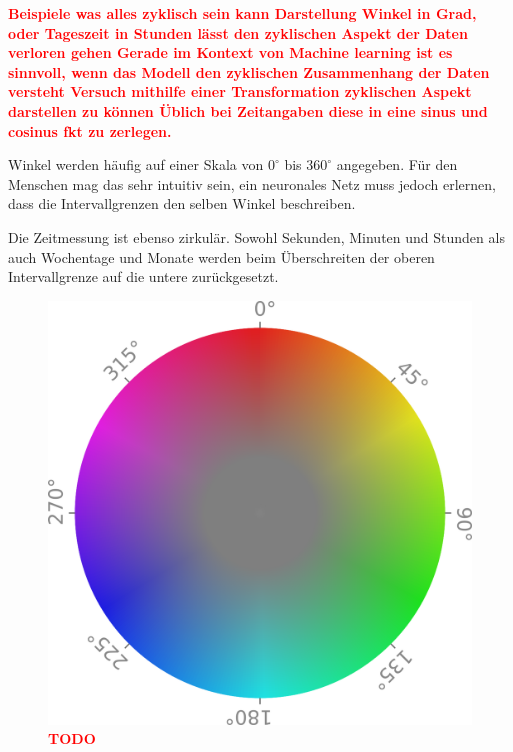 \documentclass[
12pt, %
toc=listofnumbered, %
toc=chapterentrydotfill, %
numbers=noenddot, %
captions=tableheading, %
bibliography=numbered
]{scrreprt}
\newcommand{\highlight}[1]{\textbf{\textcolor{red}{#1}}}
\begin{document}
\highlight{
	Beispiele was alles zyklisch sein kann
	Darstellung Winkel in Grad, oder Tageszeit in Stunden lässt den zyklischen Aspekt der Daten verloren gehen 
	Gerade im Kontext von Machine learning ist es sinnvoll, wenn das Modell den zyklischen Zusammenhang der Daten versteht
	Versuch mithilfe einer Transformation zyklischen Aspekt darstellen zu können
	Üblich bei Zeitangaben diese in eine sinus und cosinus fkt zu zerlegen.
	}



Winkel werden häufig auf einer Skala von $0^\circ$ bis $360^\circ$ angegeben. Für den Menschen mag das sehr intuitiv sein, ein neuronales Netz muss jedoch erlernen, dass die Intervallgrenzen den selben Winkel beschreiben.

Die Zeitmessung ist ebenso zirkulär. Sowohl Sekunden, Minuten und Stunden als auch Wochentage und Monate werden beim Überschreiten der oberen Intervallgrenze auf die untere zurückgesetzt. 

\begin{figure}[tph]
	\begin{center}
		\includegraphics[width=0.5\linewidth]{./images/colorcircle.png}
		\caption{\highlight{{TODO}} \cite{__Farbraum}}
		\label{fig:colorcircle}
	\end{center}
\end{figure}

\end{document}
